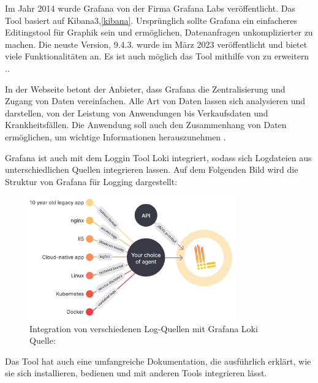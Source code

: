 Im Jahr 2014 wurde Grafana von der Firma Grafana Labs veröffentlicht. Das Tool basiert auf Kibana3,\ref{kibana}. Ursprünglich sollte Grafana ein einfacheres Editingstool für Graphik sein und ermöglichen, Datenanfragen unkomplizierter zu machen. Die neuste Version, 9.4.3. wurde im März 2023 veröffentlicht und bietet viele Funktionalitäten an. Es ist auch möglich das Tool mithilfe von    zu erweitern \citep{Oedegaard_historyGrafana}.. 

In der Webseite betont der Anbieter, dass Grafana die Zentralisierung und Zugang von Daten vereinfachen. Alle Art von Daten lassen sich analysieren und darstellen, von der Leistung von Anwendungen bis Verkaufsdaten und Krankheitsfällen. Die Anwendung soll auch den Zusammenhang von Daten ermöglichen, um wichtige Informationen herauszunehmen \citep{Grafana_Grafana}.

Grafana ist auch mit dem Loggin Tool Loki integriert, sodass sich Logdateien aus unterschiedlichen Quellen integrieren lassen. Auf dem Folgenden Bild wird die Struktur von Grafana für Logging dargestellt:

\begin{figure}[H]
   \centering
   \includegraphics[width=0.8\textwidth]{assets/2_p10.png}
   \caption{Integration von verschiedenen Log-Quellen mit Grafana Loki \\Quelle: \citep{Grafana_Logs}}
   \centering
\end{figure}

Das Tool hat auch eine umfangreiche Dokumentation, die ausführlich erklärt, wie sie sich installieren, bedienen und mit anderen Tools integrieren lässt. 


